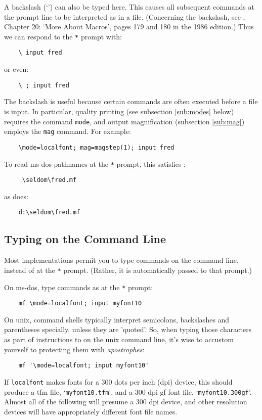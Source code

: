A backslash (`\ttbsl') can also be typed here.
This causes all subsequent commands at the prompt line to be
interpreted as in a \MF{} file.
(Concerning the backslash, see \MFbook{}, Chapter 20:
`More About Macros', pages 179 and 180 in the 1986 edition.)
Thus we can respond to the {\tt **} prompt with:
\begin{verbatim}
    \ input fred
\end{verbatim}
or even:
\begin{verbatim}
    \ ; input fred
\end{verbatim}

The backslash is useful because
certain commands are often executed before a \MF{} file is input.
In particular, quality printing
(see subsection \ref{sub:modes} below)
requires the \MF{} command {\tt mode},
and output magnification
(subsection \ref{sub:mag})
employs the {\tt mag} command.
For example:
\begin{verbatim}
    \mode=localfont; mag=magstep(1); input fred
\end{verbatim}

To read {\sc ms-dos} pathnames at the {\tt **} prompt,
this satisfies \MF{}:
\begin{verbatim}
     \seldom\fred.mf
\end{verbatim}
as does:
\begin{verbatim}
    d:\seldom\fred.mf
\end{verbatim}


\subsection{Typing on the Command Line}\label{sub:cmdline}

Most \MF{} implementations permit you to type \MF{} commands on the
command line, instead of at the {\tt **} prompt.  (Rather, it is
automatically passed to that prompt.)

On {\sc ms-dos}, type commands as at the {\tt **} prompt:
\begin{verbatim}
    mf \mode=localfont; input myfont10
\end{verbatim}

On {\sc unix}, command shells typically interpret semicolons,
backslashes and parentheses specially, unless they are 'quoted'.
So, when typing those characters as part of instructions to \MF{}
on the {\sc unix} command line, it's wise to accustom
yourself to protecting them with {\em apostrophes\/}:
\begin{verbatim}
    mf '\mode=localfont; input myfont10'
\end{verbatim}
If {\tt localfont} makes fonts for a 300 dots per inch (dpi) device,
this should produce a {\sc tfm} file, `{\tt myfont10.tfm}',
and a 300 dpi {\sc gf} font file, `{\tt myfont10.300gf}'.
Almost all of the following will presume a 300 dpi device, and other
resolution devices will have appropriately different font file names.

